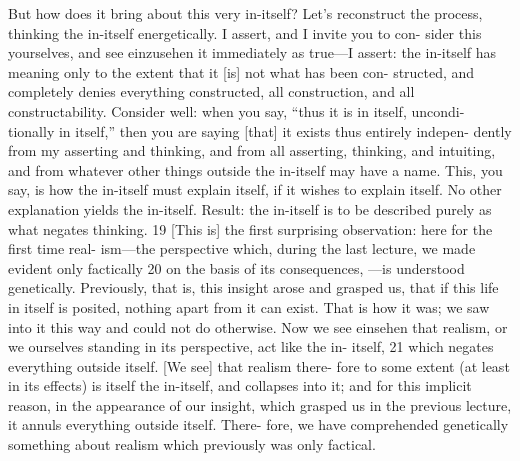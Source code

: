 But how does it bring about this very in-itself? Let’s reconstruct the
process, thinking the in-itself energetically.
I assert, and I invite you to con-
sider this yourselves, and see {einzusehen} it immediately as true—I assert: the
in-itself has meaning only to the extent that it [is] not what has been con-
structed, and completely denies everything constructed, all construction, and
all constructability.
Consider well: when you say, “thus it is in itself, uncondi-
tionally in itself,” then you are saying [that] it exists thus entirely indepen-
dently from my asserting and thinking, and from all asserting, thinking, and
intuiting, and from whatever other things outside the in-itself may have a
name.
This, you say, is how the in-itself must explain itself, if it wishes to
explain itself.
No other explanation yields the in-itself.
Result: the in-itself is
to be described purely as what negates thinking.
19
[This is] the first surprising observation: here for the first time real-
ism—the perspective which, during the last lecture, we made evident only
factically 20 on the basis of its consequences, —is understood
genetically.
Previously, that is, this insight arose and grasped us, that if this
life in itself is posited, nothing apart from it can exist.
That is how it was;
we saw into it this way and could not do otherwise.
Now we see {einsehen}
that realism, or we ourselves standing in its perspective, act like the in-
itself, 21 which negates everything outside itself.
[We see] that realism there-
fore to some extent (at least in its effects) is itself the in-itself, and collapses
into it; and for this implicit reason, in the appearance of our insight, which
grasped us in the previous lecture, it annuls everything outside itself.
There-
fore, we have comprehended genetically something about realism which
previously was only factical.

